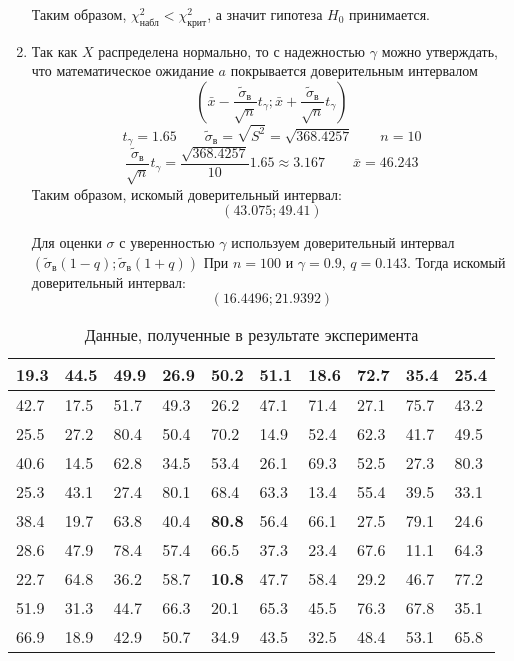 \documentclass{article}
\theoremstyle{problemstyle}
\begin{document}
\begin{enumerate}
	      Таким образом, \(\chi^2_\text{набл} < \chi^2_\text{крит}\), а значит гипотеза
	      \(H_0\) принимается.

	\item Так как \(X\) распределена нормально, то с надежностью \(\gamma\)
	      можно утверждать, что математическое ожидание \(a\) покрывается
	      доверительным интервалом
	      \[
		      \left(
		      \bar x - \frac{\tilde\sigma_\text{в}}{\sqrt{n}} t_\gamma
		      ;
		      \bar x + \frac{\tilde\sigma_\text{в}}{\sqrt{n}} t_\gamma
		      \right)
	      \]
	      \[
		      t_\gamma = 1.65
		      \qquad
		      \tilde\sigma_\text{в} = \sqrt{S^2} = \sqrt{368.4257}
		      \qquad
		      n = 10
	      \]
	      \[
		      \frac{\tilde\sigma_\text{в}}{\sqrt{n}} t_\gamma = \frac{\sqrt{368.4257}}{10} 1.65 \approx 3.167
		      \qquad
		      \bar x = 46.243
	      \]
	      Таким образом, искомый доверительный интервал:
	      \[
		      (43.075; 49.41)
	      \]

	      Для оценки $\sigma$ с уверенностью $\gamma$ используем
	      доверительный интервал \( (\tilde\sigma_\text{в} (1 - q); \tilde\sigma_\text{в} (1+q)) \)
	      При $n = 100$ и $\gamma = 0.9$, $q = 0.143$. Тогда искомый доверительный интервал:
	      \[ (16.4496; 21.9392) \]
\end{enumerate}

\begin{table}[H]
	\centering
	\begin{tabular}{|l|l|l|l|l|l|l|l|l|l|}
		\hline
		19.3 & 44.5 & 49.9 & 26.9 & 50.2          & 51.1 & 18.6 & 72.7 & 35.4 & 25.4 \\
		\hline
		42.7 & 17.5 & 51.7 & 49.3 & 26.2          & 47.1 & 71.4 & 27.1 & 75.7 & 43.2 \\
		\hline
		25.5 & 27.2 & 80.4 & 50.4 & 70.2          & 14.9 & 52.4 & 62.3 & 41.7 & 49.5 \\
		\hline
		40.6 & 14.5 & 62.8 & 34.5 & 53.4          & 26.1 & 69.3 & 52.5 & 27.3 & 80.3 \\
		\hline
		25.3 & 43.1 & 27.4 & 80.1 & 68.4          & 63.3 & 13.4 & 55.4 & 39.5 & 33.1 \\
		\hline
		38.4 & 19.7 & 63.8 & 40.4 & \textbf{80.8} & 56.4 & 66.1 & 27.5 & 79.1 & 24.6 \\
		\hline
		28.6 & 47.9 & 78.4 & 57.4 & 66.5          & 37.3 & 23.4 & 67.6 & 11.1 & 64.3 \\
		\hline
		22.7 & 64.8 & 36.2 & 58.7 & \textbf{10.8} & 47.7 & 58.4 & 29.2 & 46.7 & 77.2 \\
		\hline
		51.9 & 31.3 & 44.7 & 66.3 & 20.1          & 65.3 & 45.5 & 76.3 & 67.8 & 35.1 \\
		\hline
		66.9 & 18.9 & 42.9 & 50.7 & 34.9          & 43.5 & 32.5 & 48.4 & 53.1 & 65.8 \\
		\hline
	\end{tabular}
	\caption{Данные, полученные в результате эксперимента}\label{table:data}
\end{table}
\end{document}
